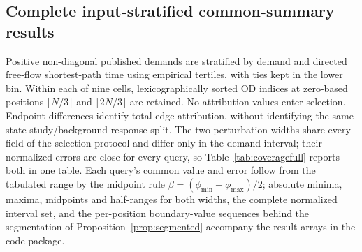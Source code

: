\subsection{Complete input-stratified common-summary results}\label{sec:coverage}
Positive non-diagonal published demands are stratified by demand and directed free-flow shortest-path time using empirical tertiles, with ties kept in the lower bin. Within each of nine cells, lexicographically sorted OD indices at zero-based positions $\lfloor N/3\rfloor$ and $\lfloor2N/3\rfloor$ are retained. No attribution values enter selection. Endpoint differences identify total edge attribution, without identifying the same-state study/background response split. The two perturbation widths share every field of the selection protocol and differ only in the demand interval; their normalized errors are close for every query, so Table~\ref{tab:coveragefull} reports both in one table. Each query's common value and error follow from the tabulated range by the midpoint rule $\beta=(\phi_{\min}+\phi_{\max})/2$; absolute minima, maxima, midpoints and half-ranges for both widths, the complete normalized interval set, and the per-position boundary-value sequences behind the segmentation of Proposition~\ref{prop:segmented} accompany the result arrays in the code package.
